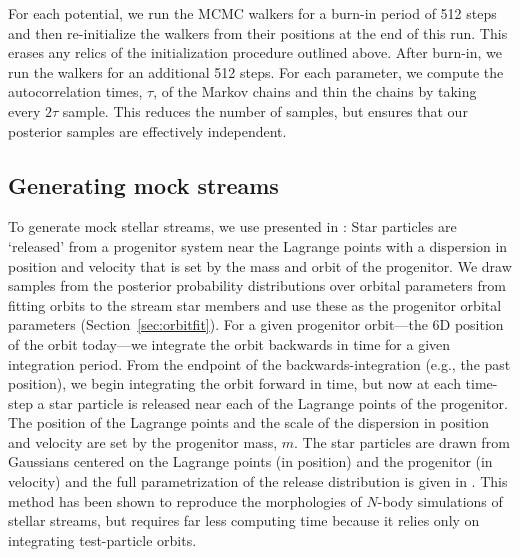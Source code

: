 \documentclass[letterpaper,12pt,preprint]{aastex}
\begin{document}
For each potential, we run the MCMC walkers for a burn-in period of 512 steps and then re-initialize the walkers from their positions at the end of this run. This erases any relics of the initialization procedure outlined above. After burn-in, we run the walkers for an additional 512 steps. For each parameter, we compute the autocorrelation times, $\tau$, of the Markov chains and thin the chains by taking every $2\tau$ sample. This reduces the number of samples, but ensures that our posterior samples are effectively independent.

\subsection{Generating mock streams}\label{sec:mocks}

To generate mock stellar streams, we use  presented in \citet{fardal14}: Star particles are `released' from a progenitor system near the Lagrange points with a dispersion in position and velocity that is set by the mass and orbit of the progenitor. We draw samples from the posterior probability distributions over orbital parameters from fitting orbits to the stream star members and use these as the progenitor orbital parameters (Section~\ref{sec:orbitfit}). For a given progenitor orbit---the 6D position of the orbit today---we integrate the orbit backwards in time for a given integration period. From the endpoint of the backwards-integration (e.g., the past position), we begin integrating the orbit forward in time, but now at each time-step a star particle is released near each of the Lagrange points of the progenitor.  The position of the Lagrange points and the scale of the dispersion in position and velocity are set by the progenitor mass, $m$. The star particles are drawn from Gaussians centered on the Lagrange points (in position) and the progenitor (in velocity) and the full parametrization of the release distribution is given in \cite{fardal14}. This method has been shown to reproduce the morphologies of $N$-body simulations of stellar streams, but requires far less computing time because it relies only on integrating test-particle orbits.
\end{document}
